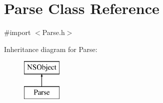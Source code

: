 \hypertarget{interface_parse}{}\section{Parse Class Reference}
\label{interface_parse}


{\ttfamily \#import $<$Parse.\+h$>$}

Inheritance diagram for Parse\+:\begin{figure}[H]
\begin{center}
\leavevmode
\includegraphics[height=2.000000cm]{interface_parse}
\end{center}
\end{figure}

